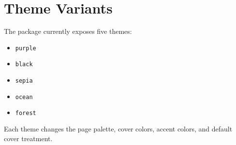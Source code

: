 \chapter{Theme Variants}

The package currently exposes five themes:

\begin{itemize}
  \item \texttt{purple}
  \item \texttt{black}
  \item \texttt{sepia}
  \item \texttt{ocean}
  \item \texttt{forest}
\end{itemize}

Each theme changes the page palette, cover colors, accent colors, and default
cover treatment.